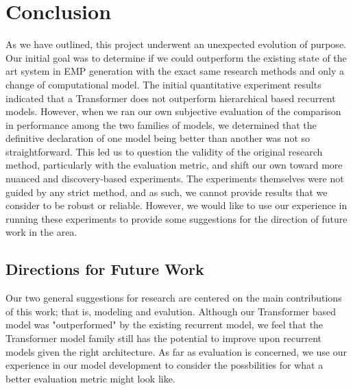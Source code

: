 \chapter{Conclusion} \label{ch:ch8}
As we have outlined, this project underwent an unexpected evolution of purpose. Our initial goal was to determine if we could outperform the existing state of the art system in EMP generation with the exact same research methods and only a change of computational model. The initial quantitative experiment results indicated that a Transformer does not outperform hierarchical based recurrent models. However, when we ran our own subjective evaluation of the comparison in performance among the two families of models, we determined that the definitive declaration of one model being better than another was not so straightforward. This led us to question the validity of the original research method, particularly with the evaluation metric, and shift our own toward more nuanced and discovery-based experiments. The experiments themselves were not guided by any strict method, and as such, we cannot provide results that we consider to be robust or reliable. However, we would like to use our experience in running these experiments to provide some suggestions for the direction of future work in the area. 

\section{Directions for Future Work}
Our two general suggestions for research are centered on the main contributions of this work; that is, modeling and evalution. Although our Transformer based model was "outperformed" by the existing recurrent model, we feel that the Transformer model family still has the potential to improve upon recurrent models given the right architecture. As far as evaluation is concerned, we use our experience in our model development to consider the possbilities for what a better evaluation metric might look like. 

